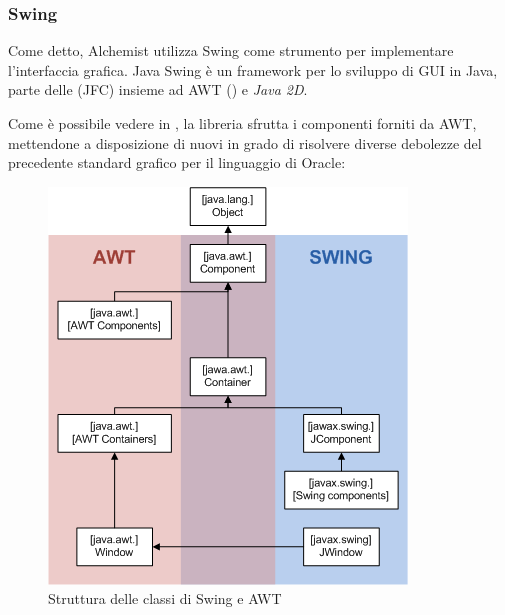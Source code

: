             \subsubsection{Swing}\label{subsubsec:swing}
                Come detto, Alchemist utilizza Swing come strumento per implementare l'interfaccia grafica.
                Java Swing è un framework per lo sviluppo di GUI in Java, parte delle  (JFC) insieme ad AWT () e \emph{Java 2D}.

                Come è possibile vedere in , la libreria sfrutta i componenti forniti da AWT, mettendone a disposizione di nuovi in grado di risolvere diverse debolezze del precedente standard grafico per il linguaggio di Oracle:

                \begin{figure}[htbp]
                    \centering
                    \includegraphics[scale=.45]{img/AWTSwing}
                    \caption{Struttura delle classi di Swing e AWT}
                    \label{fig:awt}
                \end{figure}

